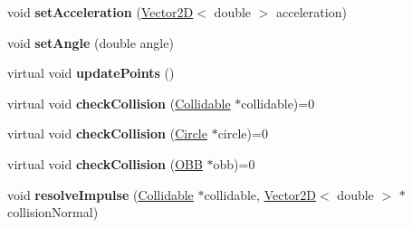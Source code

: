 \begin{DoxyCompactItemize}
\item 
\hypertarget{class_collidable_a83907e8e283705fbcb932cf4dd95498a}{}void {\bfseries set\+Acceleration} (\hyperlink{class_vector2_d}{Vector2\+D}$<$ double $>$ acceleration)\label{class_collidable_a83907e8e283705fbcb932cf4dd95498a}

\item 
\hypertarget{class_collidable_a04f3dd033a01ad9f66603902a51f7c9e}{}void {\bfseries set\+Angle} (double angle)\label{class_collidable_a04f3dd033a01ad9f66603902a51f7c9e}

\item 
\hypertarget{class_collidable_abeb14a34d7c7dc47b0c3c51a25a44e64}{}virtual void {\bfseries update\+Points} ()\label{class_collidable_abeb14a34d7c7dc47b0c3c51a25a44e64}

\item 
\hypertarget{class_collidable_a25c916c15277425a1b2606d35c7405fe}{}virtual void {\bfseries check\+Collision} (\hyperlink{class_collidable}{Collidable} $\ast$collidable)=0\label{class_collidable_a25c916c15277425a1b2606d35c7405fe}

\item 
\hypertarget{class_collidable_a157281cb33cb695c8eb0c8dd971b84f2}{}virtual void {\bfseries check\+Collision} (\hyperlink{class_circle}{Circle} $\ast$circle)=0\label{class_collidable_a157281cb33cb695c8eb0c8dd971b84f2}

\item 
\hypertarget{class_collidable_a90789947098d0f6f43e3ef8a944a5657}{}virtual void {\bfseries check\+Collision} (\hyperlink{class_o_b_b}{O\+B\+B} $\ast$obb)=0\label{class_collidable_a90789947098d0f6f43e3ef8a944a5657}

\item 
\hypertarget{class_collidable_a631228a3d634d7f68efcd6f95d0b491b}{}void {\bfseries resolve\+Impulse} (\hyperlink{class_collidable}{Collidable} $\ast$collidable, \hyperlink{class_vector2_d}{Vector2\+D}$<$ double $>$ $\ast$collision\+Normal)\label{class_collidable_a631228a3d634d7f68efcd6f95d0b491b}

\end{DoxyCompactItemize}
